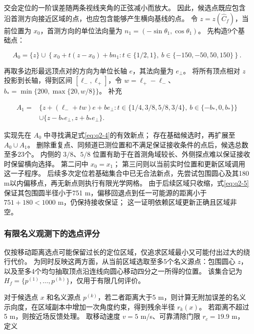 \documentclass[UTF8,a4paper,zihao=5,fontset=fandol]{ctexart}
\begin{document}
交会定位的一阶误差随两条视线夹角的正弦减小而放大。
因此，候选点既应包含沿首测方向接近区域的点，也应包含能够产生横向基线的点。
令 \(z=z(\widehat C_f)\)，当前位置为 \(x_0\)，首测方向的单位法向量为 \(n_1=(-\sin\theta_1,\cos\theta_1)\)。
先构造9个基础点：

\begin{equation}\label{eq:q2-6}
A_0=\{z\}\cup\left\{
x_0+t(z-x_0)+b n_1:
t\in\{1/2,1\},\ b\in\{-150,-50,50,150\}
\right\}.
\end{equation}

再取多边形最远顶点对的方向为单位长轴 \(e\)，其法向量为 \(e_\perp\)。
将所有顶点相对 \(z\) 投影到长轴，得到区间 \([\ell_-,\ell_+]\)，令 \(w=\ell_+-\ell_-\)、\(b_*=\min\{200,\max\{20,w/8\}\}\)。
补充

\begin{equation}\label{eq:q2-7}
\begin{aligned}
A_1={}&\{z+(\ell_-+tw)e+b e_\perp:
t\in\{1/4,3/8,5/8,3/4\},\ b\in\{-b_*,0,b_*\}\}\\
&\cup\{z-b_*e_\perp,z+b_*e_\perp\}.
\end{aligned}
\end{equation}

实现先在 \(A_0\) 中寻找满足式\eqref{eq:q2-4}的有效新点；
存在基础候选时，再扩展至 \(A_0\cup A_1\)。
删除重复点、同频道已测位置和不满足保证接收条件的点后，候选总数至多23个。
内侧的 \(3/8\)、\(5/8\) 位置有助于在首测角域较长、外侧探点难以保证接收时保留横向选择。
第二问中 \(x_0=x_1\)；
第三问则以当前实时位置和更新区域调用这一子程序。
后续多次定位若基础集合中已无合法新点，先尝试包围圆心及其180 m以内偏移点，再无新点则执行有限光学网格。
由于后续区域只收缩，式\eqref{eq:q2-5}保证其包围圆半径小于751 m，偏移回退点到任一可能源的距离小于 \(751+180<1000\) m，仍保持接收保证；
这一证明依赖区域更新正确且区域非空。

\subsubsection{有限名义观测下的选点评分}\label{sec:q2-4}

仅按移动距离选点可能保留过长的定位区域，仅追求区域最小又可能付出过大的绕行代价。
为同时反映这两方面，从当前区域选取至多5个名义源点：包围圆心 \(z\)，以及至多4个均匀抽取顶点沿连线向圆心移动四分之一所得的位置。
该集合记为 \(H_f=\{p^{(1)},\ldots,p^{(h)}\}\)，仅用于有限几何评价。

对于候选点 \(x\) 和名义源点 \(p^{(k)}\)，若二者距离大于5 m，则计算无附加误差的名义示向度，在区域副本中增加一次角度约束，得到残余半径 \(r_k(x)\)。
若距离不超过5 m，则按近场反馈处理。
取移动速度 \(v=5\) m/s、可靠清除门限 \(r_c=19.9\) m，定义
\end{document}
